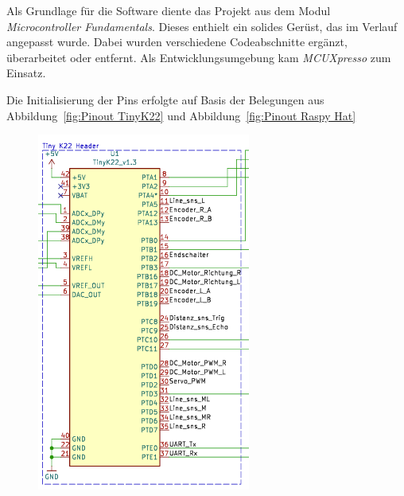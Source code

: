 Als Grundlage für die Software diente das Projekt aus dem Modul \textit{Microcontroller Fundamentals}. Dieses enthielt ein solides Gerüst, das im Verlauf angepasst wurde. Dabei wurden verschiedene Codeabschnitte ergänzt, überarbeitet oder entfernt. Als Entwicklungsumgebung kam \textit{MCUXpresso} zum Einsatz.

Die Initialisierung der Pins erfolgte auf Basis der Belegungen aus Abbildung~\ref{fig:Pinout TinyK22} und Abbildung~\ref{fig:Pinout Raspy Hat}

\begin{figure}[H]
\centering
\begin{minipage}[b]{0.45\textwidth}
  \centering
  \includegraphics[width=\textwidth]{assets/ET/Software/Tiny_Pinout.png}

\end{minipage}
\end{figure}
